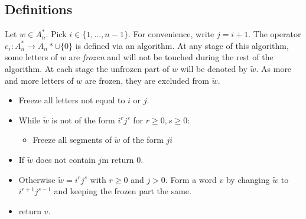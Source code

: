 \documentclass[12pt]{amsart}
\theoremstyle{definition}
\theoremstyle{example}
\begin{document}
\subsection{Definitions}
Let $w\in A_n^*$.
Pick $i\in \{1,\dotsc,n-1\}$.
For convenience, write $j=i+1$.
The operator $e_i:A_n^*\to A_n*\cup\{0\}$ is defined via an algorithm.
At any stage of this algorithm, some letters of $w$ are \emph{frozen} and will not be touched during the rest of the algorithm.
At each stage the unfrozen part of $w$ will be denoted by $\tilde w$.
As more and more letters of $w$ are frozen, they are excluded from $\tilde w$.
\begin{itemize}
\item Freeze all letters not equal to $i$ or $j$.
\item While $\tilde w$ is not of the form $i^rj^s$ for $r\geq 0, s\geq 0$:
  \begin{itemize}
  \item Freeze all segments of $\tilde w$ of the form $ji$
  \end{itemize}
\item If $\tilde w$ does not contain $j$m return $0$.
\item Otherwise $\tilde w=i^rj^s$ with $r\geq 0$ and $j>0$.
  Form a word $v$ by changing $\tilde w$ to $i^{r+1}j^{s-1}$ and keeping the frozen part the same.
\item return $v$.
\end{itemize}
\end{document}
